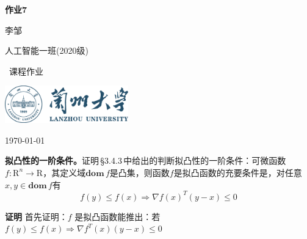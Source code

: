 \documentclass[10pt, a4paper]{article}
\newenvironment{Solution}{}
\newcommand\course{最优化方法}                         %
\begin{document}
\begin{titlepage}
    \begin{center}
        \vspace*{3.5cm}
            
        \Huge
        \textbf{作业7}
            
        \vspace{2cm}
        \LARGE
        李邹
            
        \vspace{0.1cm}
        \Large
        人工智能一班(2020级)                      %
        
            
        \vfill
        
        \course \ 课程作业
            
        \vspace{1cm}
            
        \includegraphics[width=0.4\textwidth]{lzu-logo.png}
        \\
        
        \Large
        
        \today
            
    \end{center}
\end{titlepage}


\newpage
\begin{Problem}
\textbf{拟凸性的一阶条件。}\;证明\,§3.4.3\,中给出的判断拟凸性的一阶条件：可微函数$f:\mathrm {R} ^{n}\longrightarrow \mathrm {R}  $，其定义域$\textbf{dom}\,f$是凸集，则函数$f$是拟凸函数的充要条件是，对任意$x,y\in \textbf{dom}\,f$有
\[f(y) \leq f(x) \Longrightarrow \nabla f(x)^{T}(y-x) \leq 0\]
\end{Problem}
    
\begin{Solution}
\textbf{证明}
\end{Solution}
\textbf{首先证明：}$f$ 是拟凸函数能推出：若 $f(y) \leq f(x) \Rightarrow \nabla f^{T}(x)(y-x) \leq 0$
\end{document}
